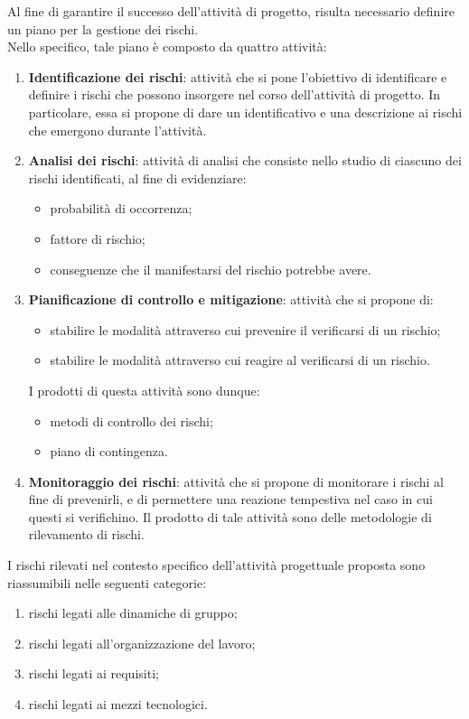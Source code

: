 	Al fine di garantire il successo dell'attività di progetto, risulta necessario definire un piano per la gestione dei rischi. \\
	Nello specifico, tale piano è composto da quattro attività:
	\begin{enumerate}
		\item \textbf{Identificazione dei rischi}: attività che si pone l'obiettivo di identificare e definire i rischi che possono insorgere nel corso dell'attività di progetto. In particolare, essa si propone di dare un identificativo e una descrizione ai rischi che emergono durante l'attività.
		\item \textbf{Analisi dei rischi}: attività di analisi che consiste nello studio di ciascuno dei rischi identificati, al fine di evidenziare:
		\begin{itemize}
			\item probabilità di occorrenza;
			\item fattore di rischio;
			\item conseguenze che il manifestarsi del rischio potrebbe avere.
		\end{itemize}
		\item \textbf{Pianificazione di controllo e mitigazione}: attività che si propone di:
			\begin{itemize}
				\item stabilire le modalità attraverso cui prevenire il verificarsi di un rischio;
				\item stabilire le modalità attraverso cui reagire al verificarsi di un rischio.
			\end{itemize}
			I prodotti di questa attività sono dunque:
			\begin{itemize}
				\item metodi di controllo dei rischi;
				\item piano di contingenza.
			\end{itemize}
		\item \textbf{Monitoraggio dei rischi}: attività che si propone di monitorare i rischi al fine di prevenirli, e di permettere una reazione tempestiva nel caso in cui questi si verifichino. Il prodotto di tale attività sono delle metodologie di rilevamento di rischi.
	\end{enumerate}
	
	I rischi rilevati nel contesto specifico dell'attività progettuale proposta sono riassumibili nelle seguenti categorie:
	\begin{enumerate}
		\item rischi legati alle dinamiche di gruppo;
		\item rischi legati all'organizzazione del lavoro;
		\item rischi legati ai requisiti;
		\item rischi legati ai mezzi tecnologici.
	\end{enumerate}

